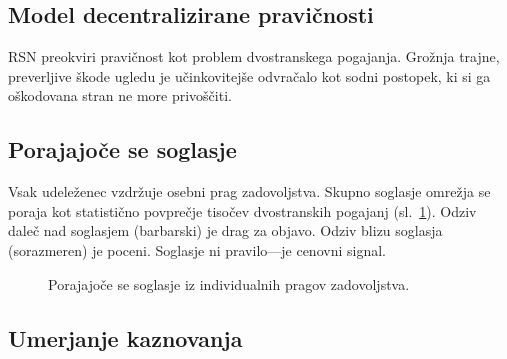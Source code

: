 \documentclass[11pt,a4paper,twocolumn]{article}
\begin{document}
\subsection{Model decentralizirane pravičnosti}

RSN preokviri pravičnost kot problem dvostranskega pogajanja. Grožnja trajne, preverljive škode ugledu je učinkovitejše odvračalo kot sodni postopek, ki si ga oškodovana stran ne more privoščiti.

\subsection{Porajajoče se soglasje}

Vsak udeleženec vzdržuje osebni prag zadovoljstva. Skupno soglasje omrežja se poraja kot statistično povprečje tisočev dvostranskih pogajanj (sl.~\ref{fig:consensus}). Odziv daleč nad soglasjem (barbarski) je drag za objavo. Odziv blizu soglasja (sorazmeren) je poceni. Soglasje ni pravilo---je cenovni signal.

\begin{figure}[ht]
\centering
{}
\caption{Porajajoče se soglasje iz individualnih pragov zadovoljstva.}
\label{fig:consensus}
\end{figure}

\subsection{Umerjanje kaznovanja}
\end{document}
